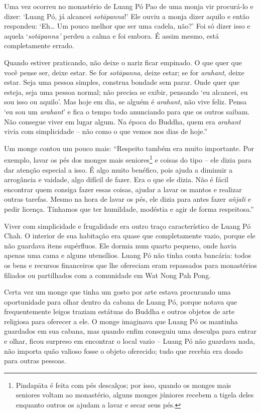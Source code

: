 Uma vez ocorreu no monastério de Luang Pó Pao de uma monja vir
procurá-lo e dizer: `Luang Pó, já alcancei \emph{sotāpanna}!' Ele ouviu
a monja dizer aquilo e então respondeu: `Eh\ldots{} Um pouco melhor que
ser uma cadela, não?' Foi só dizer isso e aquela `\emph{sotāpanna'}
perdeu a calma e foi embora. É assim mesmo, está completamente errado.

Quando estiver praticando, não deixe o nariz ficar empinado. O que quer
que você pense ser, deixe estar. Se for \emph{sotāpanna}, deixe estar;
se for \emph{arahant}, deixe estar. Seja uma pessoa simples, construa
bondade sem parar. Onde quer que esteja, seja uma pessoa normal; não
precisa se exibir, pensando `eu alcancei, eu sou isso ou aquilo'. Mas
hoje em dia, se alguém é \emph{arahant}, não vive feliz. Pensa `eu sou
um \emph{arahant}' e fica o tempo todo anunciando para que os outros
saibam. Não consegue viver em lugar algum. Na época do Buddha, quem era
\emph{arahant} vivia com simplicidade -- não como o que vemos nos dias
de hoje.''

Um monge contou um pouco mais: ``Respeito também era muito importante.
Por exemplo, lavar os pés dos monges mais seniores\footnote{Pindapāta é
  feita com pés descalços; por isso, quando os monges mais seniores
  voltam ao monastério, alguns monges júniores recebem a tigela deles
  enquanto outros os ajudam a lavar e secar seus pés.} e coisas do tipo
-- ele dizia para dar atenção especial a isso. É algo muito benéfico,
pois ajuda a diminuir a arrogância e vaidade, algo difícil de fazer. Era
o que ele dizia. Não é fácil encontrar quem consiga fazer essas coisas,
ajudar a lavar os mantos e realizar outras tarefas. Mesmo na hora de
lavar os pés, ele dizia para antes fazer \emph{añjali} e pedir licença.
Tínhamos que ter humildade, modéstia e agir de forma respeitosa.''

Viver com simplicidade e frugalidade era outro traço característico de
Luang Pó Chah. O interior de sua habitação era quase que completamente
vazio, porque ele não guardava itens supérfluos. Ele dormia num quarto
pequeno, onde havia apenas uma cama e alguns utensílios. Luang Pó não
tinha conta bancária: todos os bens e recursos financeiros que lhe
ofereciam eram repassados para monastérios filiados ou partilhados com a
comunidade em Wat Nong Pah Pong.

Certa vez um monge que tinha um gosto por arte estava procurando uma
oportunidade para olhar dentro da cabana de Luang Pó, porque notava que
frequentemente leigos traziam estátuas do Buddha e outros objetos de
arte religiosa para oferecer a ele. O monge imaginava que Luang Pó os
mantinha guardados em sua cabana, mas quando enfim conseguiu uma
desculpa para entrar e olhar, ficou surpreso em encontrar o local vazio
-- Luang Pó não guardava nada, não importa quão valioso fosse o objeto
oferecido; tudo que recebia era doado para outras pessoas.

